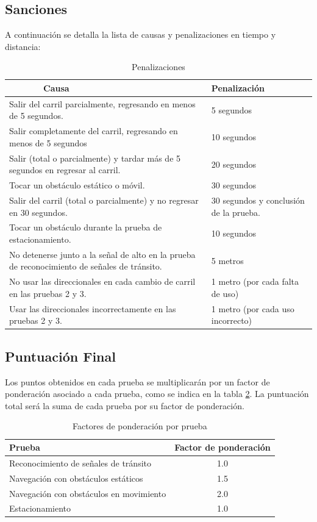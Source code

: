 \documentclass[letterpaper,12pt]{article}
\begin{document}
\subsection{Sanciones}
\label{sec:penalties}
A continuación se detalla la lista de causas y penalizaciones en tiempo y distancia:
\begin{table}[h!]
  \centering
  \begin{tabular}{|p{}|p{}|}
    \hline
    $\qquad\qquad$Causa & Penalización\\
    \hline
    Salir del carril parcialmente, regresando en menos de 5 segundos. & 5 segundos\\
    \hline
    Salir completamente del carril, regresando en menos de 5 segundos & 10 segundos\\
    \hline
    Salir (total o parcialmente) y tardar más de 5 segundos en regresar al carril. & 20 segundos\\
    \hline
    Tocar un obstáculo estático o móvil. & 30 segundos\\
    \hline
    Salir del carril (total o parcialmente) y no regresar en 30 segundos.  & 30 segundos y conclusión de la prueba.\\
    \hline
    Tocar un obstáculo durante la prueba de estacionamiento. & 10 segundos\\
    \hline
    No detenerse junto a la señal de alto en la prueba de reconocimiento de señales de tránsito. & 5 metros\\
    \hline
    No usar las direccionales en cada cambio de carril en las pruebas 2 y 3. & 1 metro (por cada falta de uso) \\
    \hline
    Usar las direccionales incorrectamente en las pruebas 2 y 3. & 1 metro (por cada uso incorrecto)\\
    \hline
  \end{tabular}
  \caption{Penalizaciones}
  \label{tab:Penalties}
\end{table}


\subsection{Puntuación Final}
\label{sec:final_score}
Los puntos obtenidos en cada prueba se multiplicarán por un factor de ponderación asociado a cada prueba, como se indica en la tabla \ref{tab:weights}. La puntuación total será la suma de cada prueba por su factor de ponderación.

\begin{table}[h!]
  \centering
  \begin{tabular}{|l|c|}
    \hline
    Prueba & Factor de ponderación\\
    \hline
    Reconocimiento de señales de tránsito & 1.0 \\
    \hline
    Navegación con obstáculos estáticos & 1.5 \\
    \hline
    Navegación con obstáculos en movimiento & 2.0 \\
    \hline
    Estacionamiento & 1.0\\
    \hline
  \end{tabular}
  \caption{Factores de ponderación por prueba}
  \label{tab:weights}
\end{table}
\end{document}
